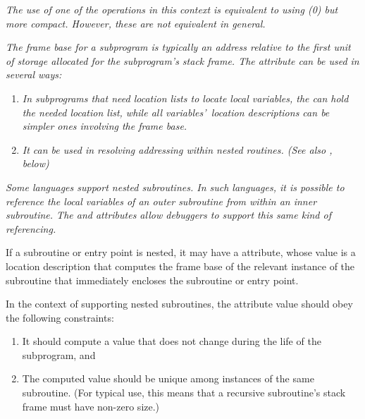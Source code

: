 \textit{The use of one of the \DWOPregn{} 
operations in this context is equivalent to using 
\DWOPbregn(0) but more
compact. However, these are not equivalent in general.}

\textit{The frame base for a subprogram is typically an address
relative to the first unit of storage allocated for the
subprogram\textquoteright s stack frame. The \DWATframebase{} attribute
can be used in several ways:}
\begin{enumerate}[1. ]
\item \textit{In subprograms that need 
location lists to locate local
variables, the \DWATframebase{} can hold the needed location
list, while all variables\textquoteright\  location descriptions can be
simpler ones involving the frame base.}

\item \textit{It can be used in resolving  addressing
within nested routines. 
(See also \DWATstaticlink, below)}
\end{enumerate}

\textit{Some languages support nested subroutines. In such languages,
it is possible to reference the local variables of an
outer subroutine from within an inner subroutine. The
\DWATstaticlink{} and \DWATframebase{} attributes allow
debuggers to support this same kind of referencing.}

If\hypertarget{chap:DWATstaticlinklocationofuplevelframe}{}
a subroutine or entry point is nested, it may have a
\DWATstaticlinkDEFN{} attribute, whose value is a location
description that computes the frame base of the relevant
instance of the subroutine that immediately encloses the
subroutine or entry point.

In the context of supporting nested subroutines, the
\DWATframebase{} attribute value should obey the following
constraints:

\begin{enumerate}[1. ]
\item It should compute a value that does not change during the
life of the subprogram, and

\item The computed value should be unique among instances of
the same subroutine. (For typical \DWATframebase{} use, this
means that a recursive subroutine\textquoteright s stack frame must have
non-zero size.)
\end{enumerate}


